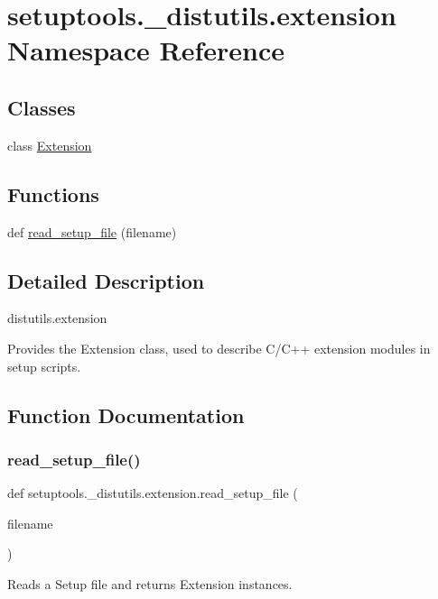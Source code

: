 \hypertarget{namespacesetuptools_1_1__distutils_1_1extension}{}\section{setuptools.\+\_\+distutils.\+extension Namespace Reference}
\label{namespacesetuptools_1_1__distutils_1_1extension}
\subsection*{Classes}
\begin{DoxyCompactItemize}
\item 
class \hyperlink{classsetuptools_1_1__distutils_1_1extension_1_1Extension}{Extension}
\end{DoxyCompactItemize}
\subsection*{Functions}
\begin{DoxyCompactItemize}
\item 
def \hyperlink{namespacesetuptools_1_1__distutils_1_1extension_a74427640ea029bdad5f27b30aa63bbac}{read\+\_\+setup\+\_\+file} (filename)
\end{DoxyCompactItemize}


\subsection{Detailed Description}
\begin{DoxyVerb}distutils.extension

Provides the Extension class, used to describe C/C++ extension
modules in setup scripts.\end{DoxyVerb}
 

\subsection{Function Documentation}
\mbox{\label{namespacesetuptools_1_1__distutils_1_1extension_a74427640ea029bdad5f27b30aa63bbac}} 
\subsubsection{\texorpdfstring{read\+\_\+setup\+\_\+file()}{read\_setup\_file()}}
{\footnotesize\ttfamily def setuptools.\+\_\+distutils.\+extension.\+read\+\_\+setup\+\_\+file (\begin{DoxyParamCaption}\item[{}]{filename }\end{DoxyParamCaption})}

\begin{DoxyVerb}Reads a Setup file and returns Extension instances.\end{DoxyVerb}
 
